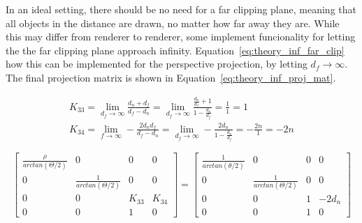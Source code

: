 In an ideal setting, there should be no need for a far clipping plane, meaning that all objects in the distance are drawn, no matter how far away they are. While this may differ from renderer to renderer, some implement funcionality for letting the the far clipping plane approach infinity. Equation~\eqref{eq:theory_inf_far_clip} how this can be implemented for the perspective projection, by letting $d_f \rightarrow \infty$. The final projection matrix is shown in Equation~\eqref{eq:theory_inf_proj_mat}.

\begin{equation}
    \begin{aligned}
    K_{33} = \lim_{d_f \rightarrow \infty} \frac{d_n+d_f}{d_f-d_n} =
    \lim_{d_f \rightarrow \infty} \frac{\frac{d_n}{d_f}+1}{1-\frac{d_n}{d_f}} = 
    \frac{1}{1} = 1 \\
    K_{34} = \lim_{f \rightarrow \infty} -\frac{2d_n d_f}{d_f-d_n} = 
    \lim_{d_f \rightarrow \infty} -\frac{2d_n}{1-\frac{d_n}{d_f}} =
    -\frac{2n}{1} = -2n
    \end{aligned}
    \label{eq:theory_inf_far_clip}
\end{equation}

\begin{equation}
    \begin{bmatrix}
        \frac{\rho}{arctan(\Theta/2)} & 0 & 0 & 0 \\
        0 & \frac{1}{arctan(\Theta/2)} & 0 & 0 \\
        0 & 0 & K_{33} & K_{34} \\
        0 & 0 & 1 & 0 
    \end{bmatrix} = \begin{bmatrix}
        \frac{1}{arctan(\theta/2)} & 0 & 0 & 0 \\
        0 & \frac{1}{arctan(\Theta/2)} & 0 & 0 \\
        0 & 0 & 1 & -2d_n \\
        0 & 0 & 1 & 0 
    \end{bmatrix}
    \label{eq:theory_inf_proj_mat}
\end{equation}




